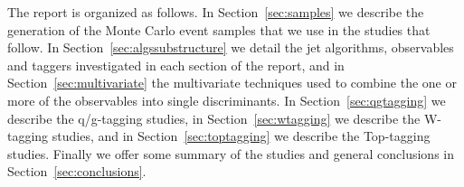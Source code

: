 

The report is organized as follows. In Section~\ref{sec:samples} we describe the generation of the Monte Carlo event samples that we use in the studies that follow. In Section~\ref{sec:algssubstructure} we detail the jet algorithms, observables and taggers investigated in each section of the report, and in Section~\ref{sec:multivariate} the multivariate techniques used to combine the one or more of the observables into single discriminants. In Section~\ref{sec:qgtagging} we describe the q/g-tagging studies, in Section~\ref{sec:wtagging} we describe the W-tagging studies, and in Section~\ref{sec:toptagging} we describe the Top-tagging studies. Finally we offer some summary of the studies and general conclusions in Section~\ref{sec:conclusions}.